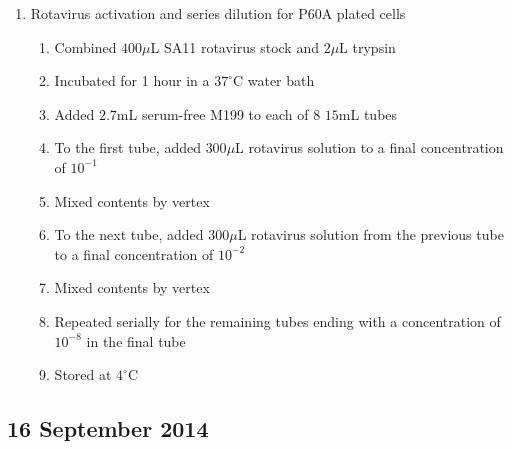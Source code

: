 \begin{enumerate}
	\item Rotavirus activation and series dilution for P60A plated cells
		\begin{enumerate}
			\item Combined $400\mu$L SA11 rotavirus stock and $2\mu$L trypsin
			\item Incubated for 1 hour in a $37^{\circ}$C water bath
			\item Added $2.7$mL serum-free M199 to each of 8 $15$mL tubes
			\item To the first tube, added $300\mu$L rotavirus solution to a final concentration of $10^{-1}$
			\item Mixed contents by vertex
			\item To the next tube, added $300\mu$L rotavirus solution from the previous tube to a final concentration of $10^{-2}$
			\item Mixed contents by vertex
			\item Repeated serially for the remaining tubes ending with a concentration of $10^{-8}$ in the final tube
			\item Stored at $4^{\circ}$C
		\end{enumerate}
\end{enumerate}

\subsection*{16 September 2014}


